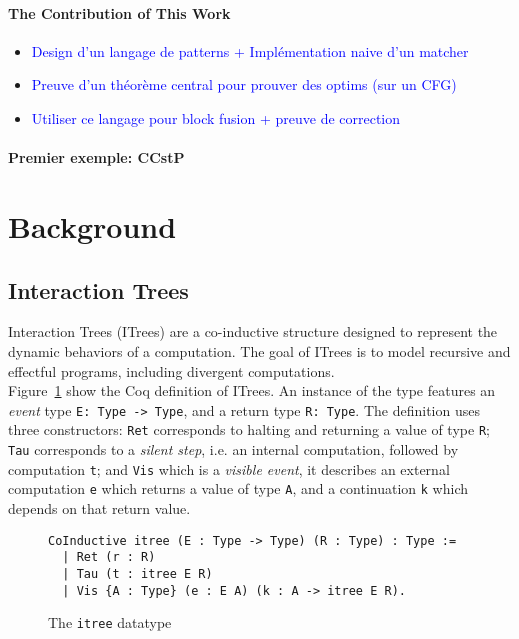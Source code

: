 \documentclass[11pt]{article}
\newcommand{\inlinecoq}[1]{\mbox{\lstinline[style=customcoq,columns=fixed,basewidth=.48em]{#1}}}
\newcommand{\ilc}[1]{\inlinecoq{#1}}
\newcommand{\leon}[1]{\textcolor{blue}{#1}}
\begin{document}
\paragraph{The Contribution of This Work}

\begin{itemize}
  \item \leon{Design d'un langage de patterns + Implémentation naive d'un matcher}
  \item \leon{Preuve d'un théorème central pour prouver des optims (sur un CFG)}
  \item \leon{Utiliser ce langage pour block fusion + preuve de correction}
\end{itemize}
\paragraph{Premier exemple: CCstP}

\section{Background}
\label{sec:background}

\subsection{Interaction Trees}

Interaction Trees (ITrees) are a co-inductive structure designed to represent the dynamic behaviors of a computation. The goal of ITrees is to model recursive and effectful programs, including divergent computations.\\
Figure~\ref{fig:itree} show the Coq definition of ITrees. An instance of the type features an \emph{event} type \ilc{E: Type -> Type}, and a return type \ilc{R: Type}. The definition uses three constructors: \ilc{Ret} corresponds to halting and returning a value of type \ilc{R}; \ilc{Tau} corresponds to a \emph{silent step}, i.e. an internal computation, followed by computation \ilc{t}; and \ilc{Vis} which is a \emph{visible event}, it describes an external computation \ilc{e} which returns a value of type \ilc{A}, and a continuation \ilc{k} which depends on that return value.

\begin{figure}[h]
  \begin{lstlisting}[style=customcoq,basicstyle=\small\ttfamily]
CoInductive itree (E : Type -> Type) (R : Type) : Type :=
  | Ret (r : R)
  | Tau (t : itree E R)
  | Vis {A : Type} (e : E A) (k : A -> itree E R).
  \end{lstlisting}
  \caption{The \ilc{itree} datatype}
  \label{fig:itree}
\end{figure}
\end{document}
